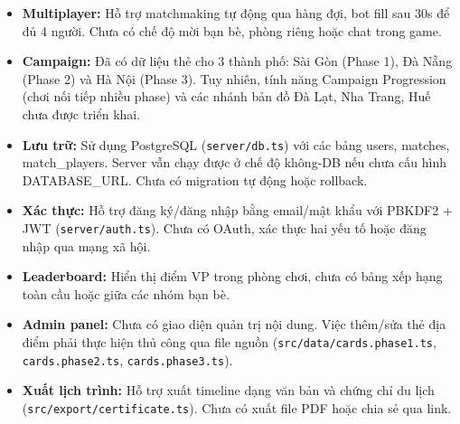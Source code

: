 \begin{itemize}[topsep=0pt, itemsep=4pt, leftmargin=1.5cm]
    \item \textbf{Multiplayer:} Hỗ trợ matchmaking tự động qua hàng đợi, bot fill sau 30s để đủ 4 người. Chưa có chế độ mời bạn bè, phòng riêng hoặc chat trong game.

    \item \textbf{Campaign:} Đã có dữ liệu thẻ cho 3 thành phố: Sài Gòn (Phase 1), Đà Nẵng (Phase 2) và Hà Nội (Phase 3). Tuy nhiên, tính năng Campaign Progression (chơi nối tiếp nhiều phase) và các nhánh bản đồ Đà Lạt, Nha Trang, Huế chưa được triển khai.

    \item \textbf{Lưu trữ:} Sử dụng PostgreSQL (\texttt{server/db.ts}) với các bảng users, matches, match\_players. Server vẫn chạy được ở chế độ không-DB nếu chưa cấu hình DATABASE\_URL. Chưa có migration tự động hoặc rollback.

    \item \textbf{Xác thực:} Hỗ trợ đăng ký/đăng nhập bằng email/mật khẩu với PBKDF2 + JWT (\texttt{server/auth.ts}). Chưa có OAuth, xác thực hai yếu tố hoặc đăng nhập qua mạng xã hội.

    \item \textbf{Leaderboard:} Hiển thị điểm VP trong phòng chơi, chưa có bảng xếp hạng toàn cầu hoặc giữa các nhóm bạn bè.

    \item \textbf{Admin panel:} Chưa có giao diện quản trị nội dung. Việc thêm/sửa thẻ địa điểm phải thực hiện thủ công qua file nguồn (\texttt{src/data/cards.phase1.ts}, \texttt{cards.phase2.ts}, \texttt{cards.phase3.ts}).

    \item \textbf{Xuất lịch trình:} Hỗ trợ xuất timeline dạng văn bản và chứng chỉ du lịch (\texttt{src/export/certificate.ts}). Chưa có xuất file PDF hoặc chia sẻ qua link.
\end{itemize}